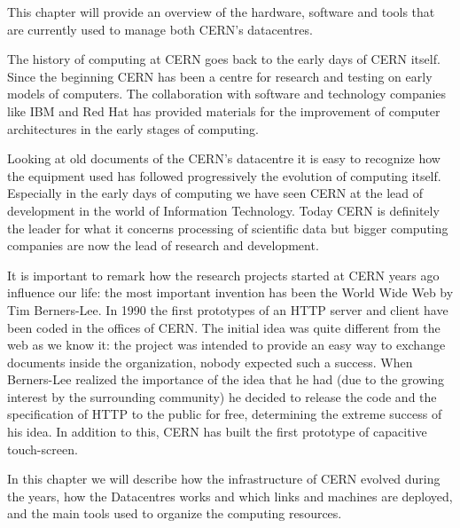 This chapter will provide an overview of the hardware, software and tools
that are currently used to manage both CERN's datacentres.

The history of computing at CERN goes back to the early days of CERN
itself. Since the beginning CERN has been a centre for research and
testing on early models of computers. The collaboration with software and
technology companies like IBM \cite{IBMWebsite} and Red Hat
\cite{RedHatWebsite} has provided materials for the improvement of
computer architectures in the early stages of computing.

Looking at old documents of the CERN's datacentre it is easy to recognize
how the equipment used has followed progressively the evolution of
computing itself. Especially in the early days of computing we have seen
CERN at the lead of development in the world of Information Technology.
Today CERN is definitely the leader for what it concerns processing of
scientific data but bigger computing companies are now the lead of
research and development.

It is important to remark how the research projects started at CERN years
ago influence our life: the most important invention has been the World
Wide Web by Tim Berners-Lee. In 1990 the first prototypes of an HTTP
server and client have been coded in the offices of CERN. The initial idea
was quite different from the web as we know it: the project was intended
to provide an easy way to exchange documents inside the organization,
nobody expected such a success. When Berners-Lee realized the importance
of the idea that he had (due to the growing interest by the surrounding
community) he decided to release the code and the specification of HTTP to
the public for free, determining the extreme success of his idea. In
addition to this, CERN has built the first prototype of capacitive
touch-screen.

In this chapter we will describe how the infrastructure of CERN evolved
during the years, how the Datacentres works and which links and machines
are deployed, and the main tools used to organize the computing resources.
